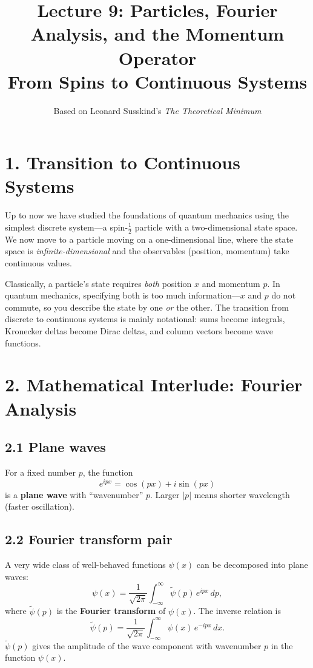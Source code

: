 \documentclass[12pt,a4paper]{article}
\title{\textbf{Lecture 9: Particles, Fourier Analysis, and the Momentum Operator} \\ \large From Spins to Continuous Systems}
\author{Based on Leonard Susskind's \textit{The Theoretical Minimum}}
\date{}
\begin{document}
\maketitle
\thispagestyle{fancy}

\section{1. Transition to Continuous Systems}

Up to now we have studied the foundations of quantum mechanics using the simplest discrete system---a spin-$\tfrac{1}{2}$ particle with a two-dimensional state space.  We now move to a particle moving on a one-dimensional line, where the state space is \emph{infinite-dimensional} and the observables (position, momentum) take continuous values.

Classically, a particle's state requires \emph{both} position $x$ and momentum $p$.  In quantum mechanics, specifying both is too much information---$x$ and $p$ do not commute, so you describe the state by one \emph{or} the other.  The transition from discrete to continuous systems is mainly notational: sums become integrals, Kronecker deltas become Dirac deltas, and column vectors become wave functions.

\section{2. Mathematical Interlude: Fourier Analysis}

\subsection{2.1 Plane waves}
For a fixed number $p$, the function
\[
    e^{ipx} = \cos(px) + i\sin(px)
\]
is a \textbf{plane wave} with ``wavenumber'' $p$.  Larger $|p|$ means shorter wavelength (faster oscillation).

\subsection{2.2 Fourier transform pair}
A very wide class of well-behaved functions $\psi(x)$ can be decomposed into plane waves:
\[
    \boxed{\psi(x) = \frac{1}{\sqrt{2\pi}}\int_{-\infty}^{\infty} \tilde{\psi}(p)\,e^{ipx}\,dp,}
\]
where $\tilde{\psi}(p)$ is the \textbf{Fourier transform} of $\psi(x)$.  The inverse relation is
\[
    \boxed{\tilde{\psi}(p) = \frac{1}{\sqrt{2\pi}}\int_{-\infty}^{\infty} \psi(x)\,e^{-ipx}\,dx.}
\]
$\tilde{\psi}(p)$ gives the amplitude of the wave component with wavenumber $p$ in the function $\psi(x)$.
\end{document}
